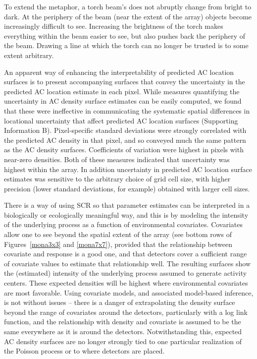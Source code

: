 \documentclass[useAMS,usenatbib,referee]{biom}
\begin{document}
To extend the metaphor, a torch beam's does not abruptly change from bright to dark. At the periphery of the beam (near the extent of the array) objects become increasingly difficult to see. Increasing the brightness of the torch makes everything within the beam easier to see, but also pushes back the periphery of the beam. Drawing a line at which the torch can no longer be trusted is to some extent arbitrary. 

An apparent way of enhancing the interpretability of predicted AC location surfaces is to present accompanying surfaces that convey the uncertainty in the predicted AC location estimate in each pixel. While measures quantifying the uncertainty in AC density surface estimates can be easily computed, we found that these were ineffective in communicating the systematic spatial differences in locational uncertainty that affect predicted AC location surfaces (Supporting Information B). Pixel-specific standard deviations were strongly correlated with the predicted AC density in that pixel, and so conveyed much the same pattern as the AC density surfaces. Coefficients of variation were highest in pixels with near-zero densities. Both of these measures indicated that uncertainty was highest within the array. In addition uncertainty in predicted AC location surface estimates was sensitive to the arbitrary choice of grid cell size, with higher precision (lower standard deviations, for example) obtained with larger cell sizes. 

There is a way of using SCR so that parameter estimates can be interpreted in a biologically or ecologically meaningful way, and this is by modeling the intensity of the underlying process as a function of environmental covariates. Covariates allow one to see beyond the spatial extent of the array (see bottom rows of Figures~\ref{mona3x3} and \ref{mona7x7}), provided that the relationship between covariate and response is a good one, and that detectors cover a sufficient range of covariate values to estimate that relationship well. The resulting surfaces show the (estimated) intensity of the underlying process assumed to generate activity centers. These expected densities will be highest where environmental covariates are most favorable. Using covariate models, and associated model-based inference, is not without issues -- there is a danger of extrapolating the density surface beyond the range of covariates around the detectors, particularly with a log link function, and the relationship with density and covariate is assumed to be the same everywhere as it is around the detectors. Notwithstanding this, expected AC density surfaces are no longer strongly tied to one particular realization of the Poisson process or to where detectors are placed.
\end{document}
